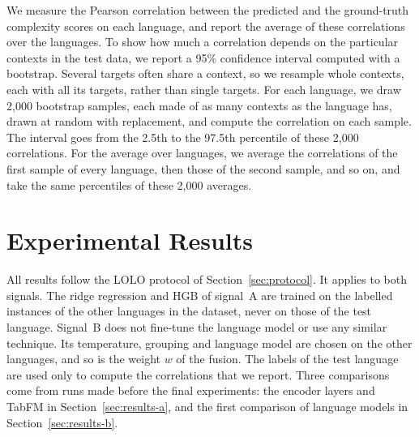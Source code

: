 We measure the Pearson correlation between the predicted and the ground-truth complexity scores on each %
language, and report the average of these correlations over the languages. To show how much a %
correlation depends on the particular contexts in the test data, we report a 95\% confidence
interval computed with a bootstrap. Several targets often share a context, so we resample whole %
contexts, each with all its targets, rather than single targets. For each language, we draw 2{,}000 %
bootstrap samples, each made of as many contexts as the language has, drawn at random with
replacement, and compute the correlation on each sample. The interval goes from the 2.5th to the
97.5th percentile of these 2{,}000 correlations. For the average over languages, we average the %
correlations of the first sample of every language, then those of the second sample, and so on, and
take the same percentiles of these 2{,}000 averages.

\section{Experimental Results}
\label{sec:results}

All results follow the LOLO protocol of Section~\ref{sec:protocol}. It applies to both signals. %
The ridge regression and HGB of signal~A are trained on the labelled instances of the other %
languages in the dataset, never on those of the test language. Signal~B does not fine-tune the
language model or use any similar technique. Its temperature, grouping and language model are %
chosen on the other languages, and so is the weight $w$ of the fusion. The %
labels of the test language are used only to compute the correlations that we report. Three
comparisons come from runs made before the final experiments: the encoder layers and TabFM in
Section~\ref{sec:results-a}, and the first comparison of language models in
Section~\ref{sec:results-b}.

